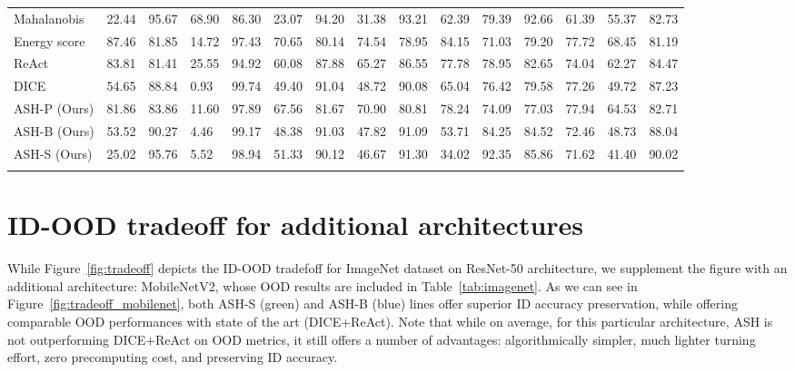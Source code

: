 \documentclass{article}
\newcommand{\figref}[1]{Figure~\ref{fig:#1}}
\newcommand{\tablabel}[1]{\label{tab:#1}}
\newcommand{\tabref}[1]{Table~\ref{tab:#1}}
\begin{document}
\begin{sidewaystable}
{\begin{tabular}{lllllllllllllll}
Mahalanobis & 22.44 & 95.67 & 68.90 & 86.30 & 23.07 & 94.20 & 31.38 & 93.21 & 62.39 & 79.39 & 92.66 & 61.39 & 55.37 & 82.73 \\
Energy score & 87.46 & 81.85 & 14.72 & 97.43 & 70.65 & 80.14 & 74.54 & 78.95 & 84.15 & 71.03 & 79.20 & 77.72 & 68.45 & 81.19 \\ 
ReAct & 83.81 & 81.41 & 25.55 & 94.92 & 60.08 & 87.88 & 65.27 & 86.55 & 77.78 & 78.95 & 82.65 & 74.04 & 62.27 & 84.47 \\
{DICE} & 54.65 & 88.84 & 0.93 & 99.74 & 49.40 & 91.04 & 48.72 & 90.08 & 65.04 & 76.42 & 79.58 & 77.26 & 49.72 & 87.23 \\

\rowcolor{lightgray}ASH-P (Ours) & 81.86 & 83.86 & 11.60 & 97.89 & 67.56 & 81.67 & 70.90 & 80.81 & 78.24 & 74.09 & 77.03 & 77.94 & 64.53 & 82.71\\
\rowcolor{lightgray}ASH-B (Ours) & 53.52 & 90.27 & 4.46 & 99.17 & 48.38 & 91.03 & 47.82 & 91.09 & 53.71 & 84.25 & 84.52 & 72.46 & 48.73 & 88.04 \\
\rowcolor{lightgray}ASH-S (Ours) & 25.02 & 95.76 & 5.52 & 98.94 & 51.33 & 90.12 & 46.67 & 91.30 & 34.02 & 92.35 & 85.86 & 71.62 & 41.40 & 90.02 \\
\\ \bottomrule
\end{tabular}}
\tablabel{detailresultscifar100}
\end{sidewaystable}


\section{ID-OOD tradeoff for additional architectures}

While \figref{tradeoff} depicts the ID-OOD tradefoff for ImageNet dataset on ResNet-50 architecture, we supplement the figure with an additional architecture: MobileNetV2, whose OOD results are included in \tabref{imagenet}. As we can see in \figref{tradeoff_mobilenet}, both ASH-S (green) and ASH-B (blue) lines offer superior ID accuracy preservation, while offering comparable OOD performances with state of the art (DICE+ReAct). Note that while on average, for this particular architecture, ASH is not outperforming DICE+ReAct on OOD metrics, it still offers a number of advantages: algorithmically simpler, much lighter turning effort, zero precomputing cost, and preserving ID accuracy.
\end{document}

